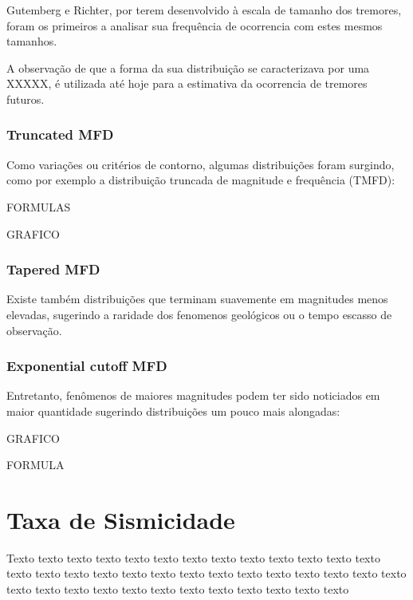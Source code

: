 Gutemberg e Richter, por terem desenvolvido à escala de tamanho dos
tremores, foram os primeiros a analisar sua frequência de ocorrencia com estes
mesmos tamanhos.

A observação de que a forma da sua distribuição se caracterizava por uma 
XXXXX, é utilizada até hoje para a estimativa da ocorrencia de tremores futuros.



\subsubsection{Truncated MFD}
\label{sec:risco_sismico}

Como variações ou critérios de contorno, algumas distribuições foram surgindo,
como por exemplo a distribuição truncada de magnitude e frequência (TMFD):


FORMULAS


GRAFICO



\subsubsection{Tapered MFD}
\label{sec:risco_sismico}


Existe também distribuições que terminam suavemente em magnitudes menos
elevadas, sugerindo a raridade dos fenomenos geológicos ou o tempo escasso de
observação.


\subsubsection{Exponential cutoff MFD}
\label{sec:risco_sismico}

Entretanto, fenômenos de maiores magnitudes podem ter sido noticiados em
maior quantidade sugerindo distribuições um pouco mais alongadas:

GRAFICO

FORMULA



\section{Taxa de Sismicidade}
\label{sec:risco_sismico}


Texto texto texto texto texto texto texto texto texto texto texto texto texto
texto texto texto texto texto texto texto texto texto texto texto texto texto
texto texto texto texto texto texto texto texto texto texto texto texto texto


